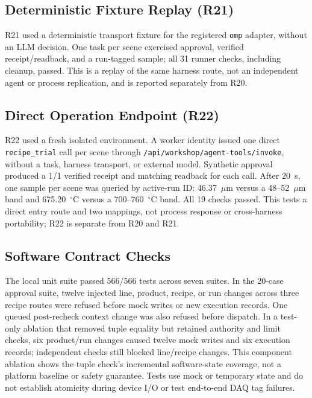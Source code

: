 \subsection{Deterministic Fixture Replay (R21)}
R21 used a deterministic transport fixture for the registered \texttt{omp}
adapter, without an LLM decision. One task per scene exercised approval,
verified receipt/readback, and a run-tagged sample; all 31 runner checks,
including cleanup, passed. This is a replay of the same harness route, not an
independent agent or process replication, and is reported separately from R20.

\subsection{Direct Operation Endpoint (R22)}
R22 used a fresh isolated environment. A worker identity issued one direct
\texttt{recipe\_trial} call per scene through
\texttt{/api/workshop/agent-tools/invoke}, without a task, harness transport,
or external model. Synthetic approval produced a 1/1 verified receipt and
matching readback for each call. After 20~s, one sample per scene was queried
by active-run ID: 46.37~$\mu$m versus a 48--52~$\mu$m band and 675.20~$^{\circ}$C
versus a 700--760~$^{\circ}$C band. All 19 checks passed. This tests a direct
entry route and two mappings, not process response or cross-harness
portability; R22 is separate from R20 and R21.

\subsection{Software Contract Checks}
The local unit suite passed 566/566 tests across seven suites. In the 20-case
approval suite, twelve injected line, product, recipe, or run changes across
three recipe routes were refused before mock writes or new execution records.
One queued post-recheck context change was also refused before dispatch. In a
test-only ablation that removed tuple equality but retained authority and
limit checks, six product/run changes caused twelve mock writes and six
execution records; independent checks still blocked line/recipe changes.
This component ablation shows the tuple check's incremental software-state
coverage, not a platform baseline or safety guarantee. Tests use mock or
temporary state and do not establish atomicity during device I/O or test
end-to-end DAQ tag failures.
